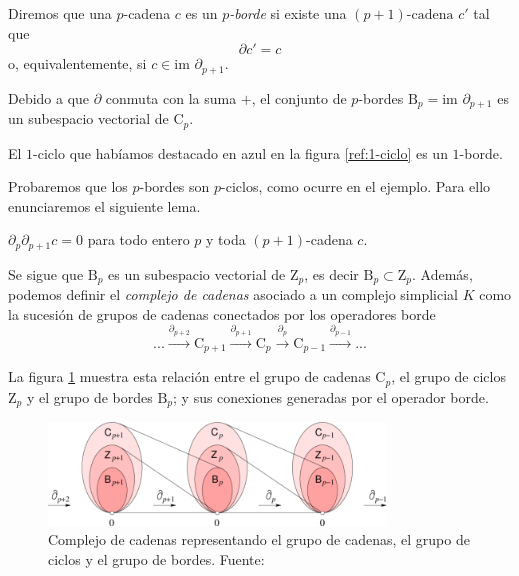 \begin{definition}
\begin{sloppypar}
Diremos que una $p$-cadena $c$ es un \emph{$p$-borde} si existe una ${(p+1)\text{-cadena}}$ $c'$ tal que
\[
\partial c' = c
\]
o, equivalentemente, si $c \in \text{im }\partial_{p+1}$.
\end{sloppypar}
\end{definition}

Debido a que $\partial$ conmuta con la suma $+$, el conjunto de $p$-bordes $\text{B}_p = \text{im }\partial_{p+1}$ es un subespacio vectorial de $\text{C}_p$.

\begin{exmp}
El $1$-ciclo que habíamos destacado en azul en la figura \ref{ref:1-ciclo} es un $1$-borde.
\end{exmp}

Probaremos que los $p$-bordes son $p$-ciclos, como ocurre en el ejemplo. Para ello enunciaremos el siguiente lema.

\begin{lemma}
$\partial_p \partial_{p+1} c = 0$ para todo entero $p$ y toda $(p + 1)$-cadena $c$.
\end{lemma}

Se sigue que $\text{B}_p$ es un subespacio vectorial de $\text{Z}_p$, es decir $\text{B}_p \subset \text{Z}_p$. Además, podemos definir el \emph{complejo de cadenas} asociado a un complejo simplicial $K$ como la sucesión de grupos de cadenas conectados por los operadores borde
\[
...\overset{\partial_{p+2}}{\longrightarrow}\text{C}_{p+1}\overset{\partial_{p+1}}{\longrightarrow}\text{C}_{p}\overset{\partial_{p}}{\longrightarrow}\text{C}_{p-1}\overset{\partial_{p-1}}{\longrightarrow}...
\]

La figura \ref{ref:gruposCadenasOpBorde} muestra esta relación entre el grupo de cadenas $\text{C}_p$, el grupo de ciclos $\text{Z}_p$ y el grupo de bordes $\text{B}_p$; y sus conexiones generadas por el operador borde.

\begin{figure}[!ht]
\centering
\includegraphics[width=0.8\textwidth]{include/figuras/The-chain-complex-consisting-of-a-linear-sequence-of-chain-cycle-and-boundary-groups.png} 
\caption{Complejo de cadenas representando el grupo de cadenas, el grupo de ciclos y el grupo de bordes. Fuente: \cite{libroEH}}
\label{ref:gruposCadenasOpBorde}
\end{figure}


